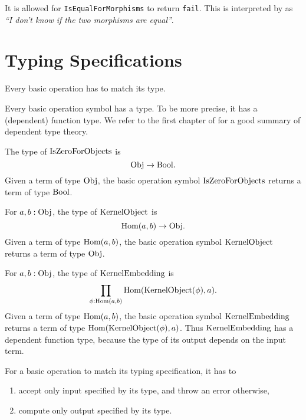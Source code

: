 \begin{remark}
 It is allowed for \texttt{IsEqualForMorphisms} to return \texttt{fail}. This is interpreted by \CapPkg as
 \textit{``I don't know if the two morphisms are equal''}.
\end{remark}


\section{Typing Specifications}

\begin{specification}
 Every basic operation has to match its type.
\end{specification}

Every basic operation symbol has a type. To be more precise, it has a (dependent) function type.
We refer to the first chapter of \cite{hottbook} for a good summary of dependent type theory.

\begin{example}\label{example:simple_typing}
 The type of $\mathrm{IsZeroForObjects}$ is
 \[
  \mathrm{Obj} \rightarrow \mathrm{Bool}.
 \]
 Given a term of type $\mathrm{Obj}$, the basic operation symbol $\mathrm{IsZeroForObjects}$ returns a term of type $\mathrm{Bool}$.
\end{example}

\begin{example}\label{example:simple_typing_with_morphism_input}
 For $a,b: \mathrm{Obj}$, the type of $\mathrm{KernelObject}$ is
 \[
  \operatorname{\mathrm{Hom}}(a,b) \rightarrow \mathrm{Obj}.
 \]
 Given a term of type $\operatorname{\mathrm{Hom}}(a,b)$, the basic operation symbol $\mathrm{KernelObject}$ returns a term of type $\mathrm{Obj}$.
\end{example}

\begin{example}\label{example:dependent_typing}
 For $a,b: \mathrm{Obj}$, the type of $\mathrm{KernelEmbedding}$ is
 \[
  \prod_{\phi: \operatorname{\mathrm{Hom}}(a,b)} \operatorname{\mathrm{Hom}}( \mathrm{KernelObject}(\phi), a ).
 \]
 Given a term of type $\operatorname{\mathrm{Hom}}(a,b)$, the basic operation symbol $\mathrm{KernelEmbedding}$ returns a term of type $\operatorname{\mathrm{Hom}}( \mathrm{KernelObject}(\phi), a )$.
 Thus $\mathrm{KernelEmbedding}$ has a dependent function type, because the type of its output depends on the input term.
\end{example}

For a basic operation to match its typing specification, it has to
\begin{enumerate}
 \item accept only input specified by its type, and throw an error otherwise,
 \item compute only output specified by its type.
\end{enumerate}

